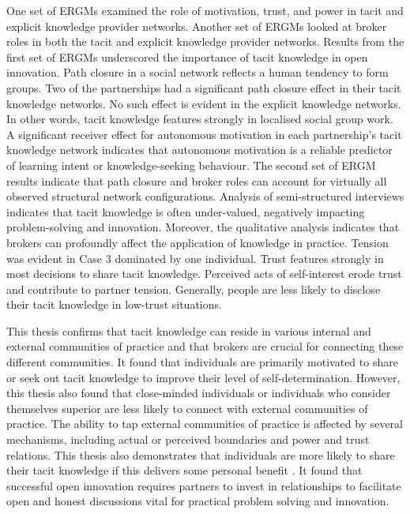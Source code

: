 One set of ERGMs examined the role of motivation, trust, and power in tacit and explicit knowledge provider networks. Another set of ERGMs looked at broker roles in both the tacit and explicit knowledge provider networks. Results from the first set of ERGMs underscored the importance of tacit knowledge in open innovation. Path closure in a social network reflects a human tendency to form groups. Two of the partnerships had a significant path closure effect in their tacit knowledge networks. No such effect is evident in the explicit knowledge networks. In other words, tacit knowledge features strongly in localised social group work. A significant receiver effect for autonomous motivation in each partnership's tacit knowledge network indicates that autonomous motivation is a reliable predictor of learning intent or knowledge-seeking behaviour. The second set of ERGM results indicate that path closure and broker roles can account for virtually all observed structural network configurations. Analysis of semi-structured interviews indicates that tacit knowledge is often under-valued, negatively impacting problem-solving and innovation. Moreover, the qualitative analysis indicates that brokers can profoundly affect the application of knowledge in practice. Tension was evident in Case 3 dominated by one individual. Trust features strongly in most decisions to share tacit knowledge. Perceived acts of self-interest erode trust and contribute to partner tension. Generally, people are less likely to disclose their tacit knowledge in low-trust situations. \medskip

This thesis confirms that tacit knowledge can reside in various internal and external communities of practice and that brokers are crucial for connecting these different communities. It found that individuals are primarily motivated to share or seek out tacit knowledge to improve their level of self-determination. However, this thesis also found that close-minded individuals or individuals who consider themselves superior are less likely to connect with external communities of practice. The ability to tap external communities of practice is affected by several mechanisms, including actual or perceived boundaries and power and trust relations. This thesis also demonstrates that individuals are more likely to share their tacit knowledge if this delivers some personal benefit \citep{liu2021more}. It found that successful open innovation requires partners to invest in relationships to facilitate open and honest discussions vital for practical problem solving and innovation.

